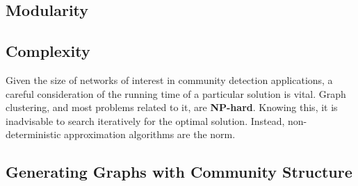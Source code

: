 




\subsection{Modularity}


\subsection{Complexity}
 Given the size of networks of interest in community detection applications, a careful consideration of the running time of a particular solution is vital. Graph clustering, and most problems related to it, are \textbf{NP-hard}\cite{Zwart2007, Brandes2003}. Knowing this, it is inadvisable to search iteratively for the optimal solution. Instead, non-deterministic approximation algorithms are the norm. 





%


\subsection{Generating Graphs with Community Structure}


